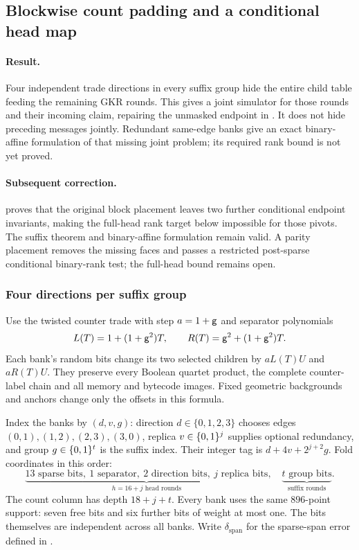 \subsection{Blockwise count padding and a conditional head map}\label{note:zk-count-suffix}

\paragraph{Result.} Four independent trade directions in every suffix group hide the entire child table feeding the remaining GKR rounds. This gives a joint simulator for those rounds and their incoming claim, repairing the unmasked endpoint in . It does not hide preceding messages jointly. Redundant same-edge banks give an exact binary-affine formulation of that missing joint problem; its required rank bound is not yet proved.

\paragraph{Subsequent correction.}  proves that the original block placement leaves two further conditional endpoint invariants, making the full-head rank target below impossible for those pivots. The suffix theorem and binary-affine formulation remain valid. A parity placement removes the missing faces and passes a restricted post-sparse conditional binary-rank test; the full-head bound remains open.

\subsubsection{Four directions per suffix group}

Use the twisted counter trade with step $a=1+\mathsf{g}$ and separator polynomials
\[
 L(T)=1+(1+\mathsf{g}^2)T,\qquad R(T)=\mathsf{g}^2+(1+\mathsf{g}^2)T.
\]
Each bank's random bits change its two selected children by $aL(T)U$ and $aR(T)U$. They preserve every Boolean quartet product, the complete counter-label chain and all memory and bytecode images. Fixed geometric backgrounds and anchors change only the offsets in this formula.

Index the banks by $(d,v,g)$: direction $d\in\{0,1,2,3\}$ chooses edges $(0,1),(1,2),(2,3),(3,0)$, replica $v\in\{0,1\}^{j}$ supplies optional redundancy, and group $g\in\{0,1\}^{t}$ is the suffix index. Their integer tag is $d+4v+2^{j+2}g$. Fold coordinates in this order:
\[
 \underbrace{13\text{ sparse bits},\ 1\text{ separator},\ 2\text{ direction bits},\ j\text{ replica bits}}_{h=16+j\text{ head rounds}},\quad
 \underbrace{t\text{ group bits}}_{\text{suffix rounds}}.
\]
The count column has depth $18+j+t$. Every bank uses the same $896$-point support: seven free bits and six further bits of weight at most one. The bits themselves are independent across all banks. Write $\delta_{\mathrm{span}}$ for the sparse-span error defined in .

